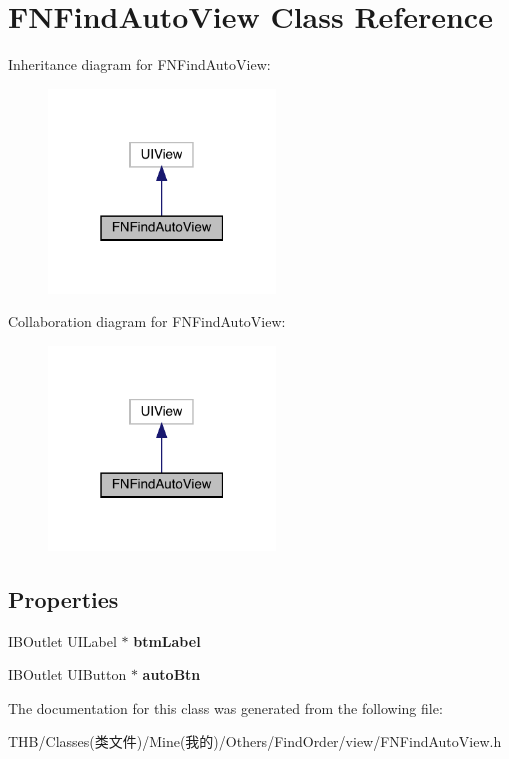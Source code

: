\hypertarget{interface_f_n_find_auto_view}{}\section{F\+N\+Find\+Auto\+View Class Reference}
\label{interface_f_n_find_auto_view}


Inheritance diagram for F\+N\+Find\+Auto\+View\+:\nopagebreak
\begin{figure}[H]
\begin{center}
\leavevmode
\includegraphics[width=171pt]{interface_f_n_find_auto_view__inherit__graph}
\end{center}
\end{figure}


Collaboration diagram for F\+N\+Find\+Auto\+View\+:\nopagebreak
\begin{figure}[H]
\begin{center}
\leavevmode
\includegraphics[width=171pt]{interface_f_n_find_auto_view__coll__graph}
\end{center}
\end{figure}
\subsection*{Properties}
\begin{DoxyCompactItemize}
\item 
\mbox{\label{interface_f_n_find_auto_view_a9704b7f6bf35b4822c696fd079cbbc92}} 
I\+B\+Outlet U\+I\+Label $\ast$ {\bfseries btm\+Label}
\item 
\mbox{\label{interface_f_n_find_auto_view_a3893150a39f880fe31f75cf340b91e11}} 
I\+B\+Outlet U\+I\+Button $\ast$ {\bfseries auto\+Btn}
\end{DoxyCompactItemize}


The documentation for this class was generated from the following file\+:\begin{DoxyCompactItemize}
\item 
T\+H\+B/\+Classes(类文件)/\+Mine(我的)/\+Others/\+Find\+Order/view/F\+N\+Find\+Auto\+View.\+h\end{DoxyCompactItemize}
